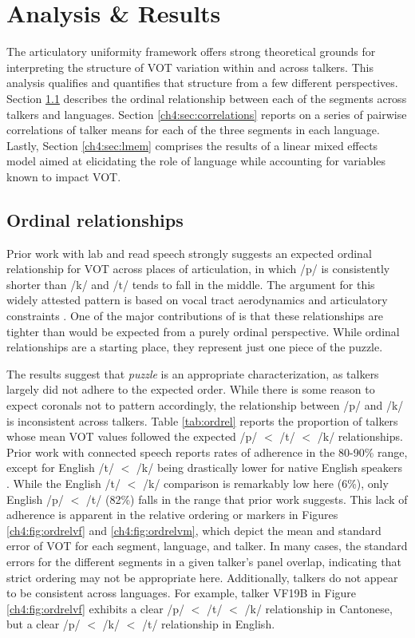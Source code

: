 \section{Analysis \& Results}
The articulatory uniformity framework offers strong theoretical grounds for interpreting the structure of VOT variation within and across talkers. This analysis qualifies and quantifies that structure from a few different perspectives. Section \ref{ch4:sec:ordrel} describes the ordinal relationship between each of the segments across talkers and languages. Section \ref{ch4:sec:correlations} reports on a series of pairwise correlations of talker means for each of the three segments in each language. Lastly, Section \ref{ch4:sec:lmem} comprises the results of a linear mixed effects model aimed at elicidating the role of language while accounting for variables known to impact VOT.


\subsection{Ordinal relationships}\label{ch4:sec:ordrel}

Prior work with lab and read speech strongly suggests an expected ordinal relationship for VOT across places of articulation, in which /p/ is consistently shorter than /k/ and /t/ tends to fall in the middle. The argument for this widely attested pattern is based on vocal tract aerodynamics and articulatory constraints \citep{cho_1999_vot}. One of the major contributions of \citet{chodroff_2017_structure} is that these relationships are tighter than would be expected from a purely ordinal perspective. While ordinal relationships are a starting place, they represent just one piece of the puzzle. 

The results suggest that \textit{puzzle} is an appropriate characterization, as talkers largely did not adhere to the expected order. While there is some reason to expect coronals not to pattern accordingly, the relationship between /p/ and /k/ is inconsistent across talkers. Table \ref{tab:ordrel} reports the proportion of talkers whose mean VOT values followed the expected /p/ $<$ /t/ $<$ /k/ relationships. Prior work with connected speech reports rates of adherence in the 80-90\% range, except for English /t/ $<$ /k/ being drastically lower for native English speakers \citep{chodroff_2019_l2}. While the English /t/ $<$ /k/ comparison is remarkably low here (6\%), only English /p/ $<$ /t/ (82\%) falls in the range that prior work suggests. This lack of adherence is apparent in the relative ordering or markers in Figures \ref{ch4:fig:ordrelvf} and \ref{ch4:fig:ordrelvm}, which depict the mean and standard error of VOT for each segment, language, and talker. In many cases, the standard errors for the different segments in a given talker's panel overlap, indicating that strict ordering may not be appropriate here. Additionally, talkers do not appear to be consistent across languages. For example, talker VF19B in Figure \ref{ch4:fig:ordrelvf} exhibits a clear  /p/ $<$ /t/ $<$ /k/ relationship in Cantonese, but a clear /p/ $<$ /k/ $<$ /t/ relationship in English. 

